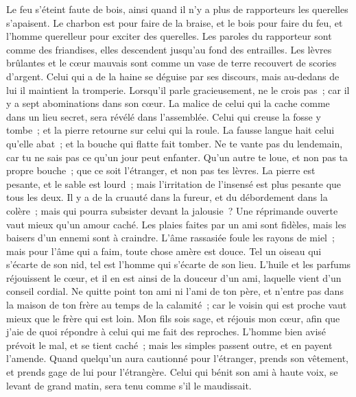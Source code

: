 \begin{multicols}{2}
Le feu s'éteint faute de bois, ainsi quand il n'y a plus de rapporteurs les querelles s'apaisent.
Le charbon est pour faire de la braise, et le bois pour faire du feu, et l'homme querelleur pour exciter des querelles.
Les paroles du rapporteur sont comme des friandises, elles descendent jusqu'au fond des entrailles.
Les lèvres brûlantes et le cœur mauvais sont comme un vase de terre recouvert de scories d'argent.
Celui qui a de la haine se déguise par ses discours, mais au-dedans de lui il maintient la tromperie.
Lorsqu'il parle gracieusement, ne le crois pas~; car il y a sept abominations dans son cœur.
La malice de celui qui la cache comme dans un lieu secret, sera révélé dans l'assemblée.
Celui qui creuse la fosse y tombe~; et la pierre retourne sur celui qui la roule.
La fausse langue hait celui qu'elle abat~; et la bouche qui flatte fait tomber.
\VerseOne{}Ne te vante pas du lendemain, car tu ne sais pas ce qu'un jour peut enfanter.
Qu'un autre te loue, et non pas ta propre bouche~; que ce soit l'étranger, et non pas tes lèvres.
La pierre est pesante, et le sable est lourd~; mais l'irritation de l'insensé est plus pesante que tous les deux.
Il y a de la cruauté dans la fureur, et du débordement dans la colère~; mais qui pourra subsister devant la jalousie~?
Une réprimande ouverte vaut mieux qu'un amour caché.
Les plaies faites par un ami sont fidèles, mais les baisers d'un ennemi sont à craindre.
L'âme rassasiée foule les rayons de miel~; mais pour l'âme qui a faim, toute chose amère est douce.
Tel un oiseau qui s'écarte de son nid, tel est l'homme qui s'écarte de son lieu.
L'huile et les parfums réjouissent le cœur, et il en est ainsi de la douceur d'un ami, laquelle vient d'un conseil cordial.
Ne quitte point ton ami ni l'ami de ton père, et n'entre pas dans la maison de ton frère au temps de la calamité~; car le voisin qui est proche vaut mieux que le frère qui est loin.
Mon fils sois sage, et réjouis mon cœur, afin que j'aie de quoi répondre à celui qui me fait des reproches.
L'homme bien avisé prévoit le mal, et se tient caché~; mais les simples passent outre, et en payent l'amende.
Quand quelqu'un aura cautionné pour l'étranger, prends son vêtement, et prends gage de lui pour l'étrangère.
Celui qui bénit son ami à haute voix, se levant de grand matin, sera tenu comme s'il le maudissait.

\end{multicols}
